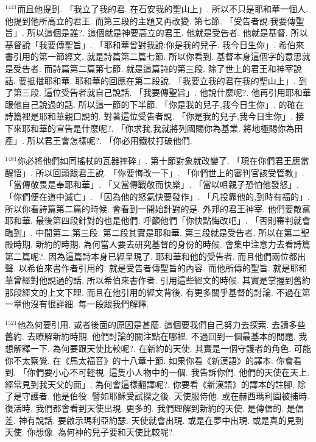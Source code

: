 \documentclass{book}
\begin{document}
$^{1441}$而且他提到.
「我立了我的君.
在石安我的聖山上」.
所以不只是耶和華一個人.
他提到他所高立的君王.
而第三段的主題又再改變.
第七節.
「受告者說:我要傳聖旨」.
所以這個是誰?.
這個就是神要高立的君王.
他就是受告者.
他就是基督.
所以基督說「我要傳聖旨」.
「耶和華曾對我說:你是我的兒子.
我今日生你」.
希伯來書引用的第一節經文.
就是詩篇第二篇七節.
所以你看到.
基督本身這個字的意思就是受告者.
而詩篇第二篇第七節.
就是這篇詩的第三段.
除了世上的君王和神宰說話.
要抵擋耶和華.
耶和華的回應在第二段說.
「我要立我的君在我的聖山上」.
到了第三段.
這位受告者就自己說話.
「我要傳聖旨」.
他說什麼呢?.
他再引用耶和華跟他自己說過的話.
所以這一節的下半節.
「你是我的兒子,我今日生你」.
的確在詩篇裡是耶和華親口說的.
對著這位受告者說.
「你是我的兒子,我今日生你」.
接下來耶和華的宣告是什麼呢?.
「你求我,我就將列國賜你為基業.
將地極賜你為田產」.
所以君王會怎樣呢?.
「你必用鐵杖打破他們.

$^{1481}$你必將他們如同搖杖的瓦器摔碎」.
第十節對象就改變了.
「現在你們君王應當醒悟」.
所以回頭跟君王說.
「你要悔改一下」.
「你們世上的審判官該受管教」.
「當傳敬畏是奉耶和華」.
「又當傳戰敬而快樂」.
「當以咀親子恐怕他發怒」.
「你們便在道中滅亡」.
「因為他的怒氣快要發作」.
「凡投靠他的,到時有福的」.
所以你看詩篇第二篇的時候.
會看到一開始針對的是.
外邦的君王神宰.
他們要敵黨耶和華.
最後第四段針對的也是他們.
呼籲他們「你快點悔改吧」.
「否則審判就會臨到」.
中間第二,第三段.
第二段其實是耶和華.
第三段就是受告者.
所以在第二聖殿時期.
新約的時期.
為何當人要去研究基督的身份的時候.
會集中注意力去看詩篇第二篇呢?.
因為這篇詩本身已經呈現了.
耶和華和他的受告者.
而且他們兩位都出聲.
以希伯來書作者引用的.
就是受告者傳聖旨的內容.
而他所傳的聖旨.
就是耶和華曾經對他說過的話.
所以希伯來書作者.
引用這些經文的時候.
其實是掌握到舊約那段經文的上文下理.
而且在他引用的經文背後.
有更多關乎基督的討論.
不過在第一章他沒有很詳細.
每一段跟我們解釋.

$^{1521}$他為何要引用.
或者後面的原因是甚麼.
這個要我們自己努力去探索.
去讀多些舊約.
去瞭解新約時期.
他們討論的關注點在哪裡.
不過回到一個最基本的問題.
我想解釋一下.
為何要跟天使比較呢?.
在新約的天使.
其實是一個守護者的角色.
可能你不太察覺.
在《馬太福音》的十八章十節.
如果你看《新漢語》的譯本.
你會看到.
「你們要小心不可輕視.
這隻小人物中的一個.
我告訴你們.
他們的天使在天上.
經常見到我天父的面」.
為何會這樣翻譯呢?.
你要看《新漢語》的譯本的註腳.
除了是守護者.
他是伯役.
譬如耶穌受試探之後.
天使服侍他.
或在赫西瑪利園被捕時.
復活時.
我們都會看到天使出現.
更多的.
我們理解到新約的天使.
是傳信的.
是信差.
神有說話.
要啟示瑪利亞約瑟.
天使就會出現.
或是在夢中出現.
或是真的見到天使.
你想像.
為何神的兒子要和天使比較呢?.
\end{document}
